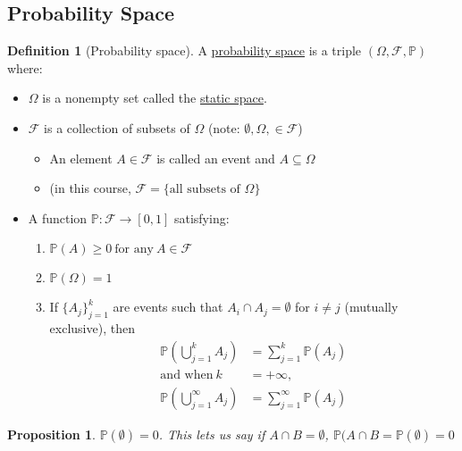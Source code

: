 \documentclass[
]{article}
\newtheorem{proposition}{Proposition}[section]
\theoremstyle{definition}
\newtheorem{definition}{Definition}[section]
\theoremstyle{definition}
\theoremstyle{definition}
\theoremstyle{remark}
\begin{document}
\subsection{Probability Space}
\begin{definition}[Probability space]
  A \underline{probability space} is a triple $(\Omega, \mathcal{F},\mathbb{P})$ where:
  \begin{itemize}
    \item $\Omega$ is a nonempty set called the \underline{static space}.
    \item $\mathcal{F}$ is a collection of subsets of $\Omega$ (note: $\emptyset, \Omega, \in\mathcal{F}$)
          \begin{itemize}
            \item An element $A\in\mathcal{F}$ is called an event and $A\subseteq\Omega$
            \item (in this course, $\mathcal{F}=\{\text{all subsets of }\Omega\}$
          \end{itemize}
    \item A function $\mathbb{P}:\mathcal{F}\longrightarrow[0,1]$ satisfying:
          \begin{enumerate}
            \item $\mathbb{P}(A)\geq 0\ \text{for any}\ A\in\mathcal{F}$
            \item $\mathbb{P}(\Omega)=1$
            \item If $\{A_j\}_{j=1}^k$ are events such that $A_i\cap A_j=\emptyset$ for $i\neq j$ (mutually exclusive), then
                  \begin{align*}
                    \mathbb{P}\left(\bigcup_{j=1}^k A_j\right)      & =
                    \sum_{j=1}^k\mathbb{P}(A_j)                                 \\
                    \text{and when}\ k                              & =+\infty, \\
                    \mathbb{P}\left(\bigcup_{j=1}^\infty A_j\right) & =
                    \sum_{j=1}^\infty\mathbb{P}(A_j)
                  \end{align*}
          \end{enumerate}
  \end{itemize}
\end{definition}

\begin{proposition}
  $\mathbb{P}(\emptyset)=0$. This lets us say if $A\cap B=\emptyset$, $\mathbb{P}(A\cap B=\mathbb{P}(\emptyset)=0$
\end{proposition}
\end{document}
